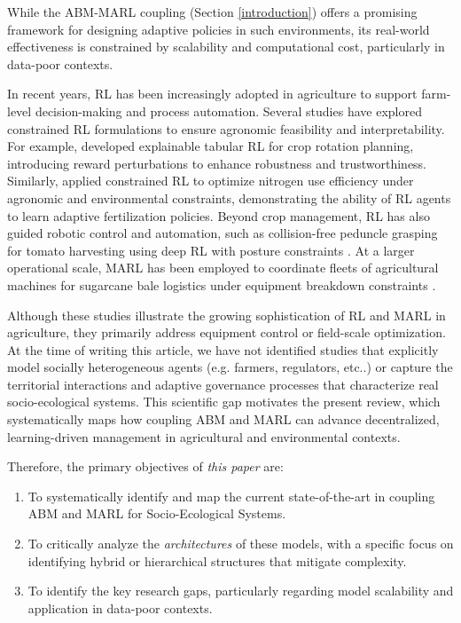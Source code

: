 \documentclass[conference]{IEEEtran}
\begin{document}
While the ABM-MARL coupling (Section \ref{introduction}) offers a promising framework for designing adaptive policies in such environments, its real-world effectiveness is constrained by scalability and computational cost, particularly in data-poor contexts.

In recent years, RL has been increasingly adopted in agriculture to support farm-level decision-making and process automation. Several studies have explored constrained RL formulations to ensure agronomic feasibility and interpretability. For example, \cite{goldenitsTabularReinforcementLearning2025} developed explainable tabular RL for crop rotation planning, introducing reward perturbations to enhance robustness and trustworthiness. Similarly, \cite{bajaAdaptiveFertilizerManagement2025} applied constrained RL to optimize nitrogen use efficiency under agronomic and environmental constraints, demonstrating the ability of RL agents to learn adaptive fertilization policies. Beyond crop management, RL has also guided robotic control and automation, such as collision-free peduncle grasping for tomato harvesting using deep RL with posture constraints \cite{liPeduncleCollisionfreeGrasping2024}. At a larger operational scale, MARL has been employed to coordinate fleets of agricultural machines for sugarcane bale logistics under equipment breakdown constraints \cite{pitakasoOptimizingSugarcaneBale2025}.

Although these studies illustrate the growing sophistication of RL and MARL in agriculture, they primarily address equipment control or field-scale optimization. At the time of writing this article, we have not identified studies that explicitly model socially heterogeneous agents (e.g. farmers, regulators, etc..) or capture the territorial interactions and adaptive governance processes that characterize real socio-ecological systems. This scientific gap motivates the present review, which systematically maps how coupling ABM and MARL can advance decentralized, learning-driven management in agricultural and environmental contexts.

Therefore, the primary objectives of \textit{this paper} are:
\begin{enumerate}
    \item To systematically identify and map the current state-of-the-art in coupling ABM and MARL for Socio-Ecological Systems.
    \item To critically analyze the \textit{architectures} of these models, with a specific focus on identifying hybrid or hierarchical structures that mitigate complexity.
    \item To identify the key research gaps, particularly regarding model scalability and application in data-poor contexts.
\end{enumerate}
\end{document}
